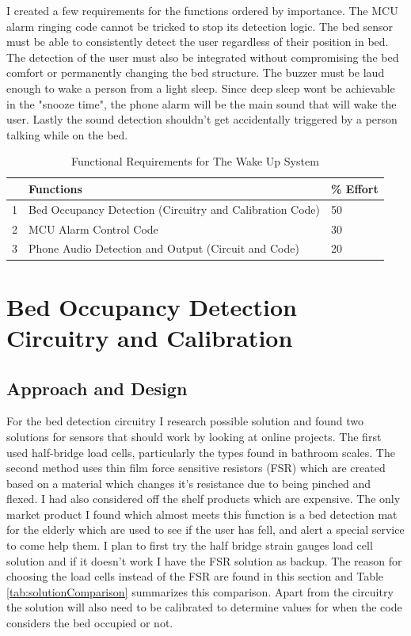 \documentclass[11pt]{article}
\begin{document}
I created a few requirements for the functions ordered by importance.
The MCU alarm ringing code cannot be tricked to stop its detection logic.
The bed sensor must be able to consistently detect the user regardless of their position in bed.
The detection of the user must also be integrated without compromising the bed comfort or permanently changing the bed structure.
The buzzer must be laud enough to wake a person from a light sleep.
Since deep sleep wont be achievable in the "snooze time", the phone alarm will be the main sound that will wake the user.
Lastly the sound detection shouldn't get accidentally triggered by a person talking while on the bed.\\

\begin{table}[H]
	\centering
	\caption{Functional Requirements for The Wake Up System}
	\begin{tabular}{|l|l|l|}
		\hline
		&\textbf{Functions} & \textbf{\% Effort} \\
		\hline
		1&Bed Occupancy Detection (Circuitry and Calibration Code) & 50\\
		2&MCU Alarm Control Code &30\\
		3&Phone Audio Detection and Output (Circuit and Code)& 20\\
		\hline
	\end{tabular}
	\label{tab:FR}
\end{table}

\section{Bed Occupancy Detection Circuitry and Calibration}
\subsection*{Approach and Design}
For the bed detection circuitry I research possible solution and found two solutions for sensors that should work by looking at online projects. 
The first used half-bridge load cells, particularly the types found in bathroom scales. 
The second method uses thin film force sensitive resistors (FSR) which are created based on a material which changes it's resistance due to being pinched and flexed. 
I had also considered off the shelf products which are expensive.
The only market product I found which almost meets this function is a bed detection mat for the elderly which are used to see if the user has fell, and alert a special service to come help them.  
I plan to first try the half bridge strain gauges load cell solution and if it doesn't work I have the FSR solution as backup.
The reason for choosing the load cells instead of the FSR are found in this section and Table \ref{tab:solutionComparison} summarizes this comparison. 
Apart from the circuitry the solution will also need  to be calibrated to determine values for when the code considers the bed occupied or not.
\\
\end{document}
